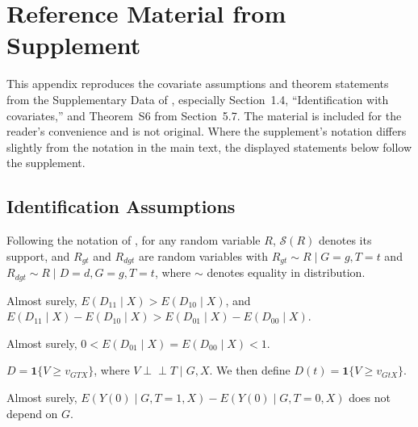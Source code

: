 \section{Reference Material from \citet{fuzzy2018} Supplement}\label{sec:app_cdh_reference}

This appendix reproduces the covariate assumptions and theorem statements from the Supplementary Data of \citet{fuzzy2018}, especially Section~1.4, ``Identification with covariates,'' and Theorem~S6 from Section~5.7. The material is included for the reader's convenience and is not original. Where the supplement's notation differs slightly from the notation in the main text, the displayed statements below follow the supplement.

\subsection{Identification Assumptions}\label{sec:app_setup}

Following the notation of \citet{fuzzy2018}, for any random variable $R$, $\mathcal{S}(R)$ denotes its support, and $R_{gt}$ and $R_{dgt}$ are random variables with $R_{gt} \sim R \mid G=g, T=t$ and $R_{dgt} \sim R \mid D=d, G=g, T=t$, where $\sim$ denotes equality in distribution.

\renewcommand{\theassumption}{\arabic{assumption}X}
\setcounter{assumption}{0}

\begin{assumption}\label{ass:1}
Almost surely, $E(D_{11}\mid X) > E(D_{10}\mid X)$, and $E(D_{11}\mid X)-E(D_{10}\mid X) > E(D_{01}\mid X)-E(D_{00}\mid X)$.
\end{assumption}

\begin{assumption}\label{ass:2}
Almost surely, $0 < E(D_{01}\mid X) = E(D_{00}\mid X) < 1$.
\end{assumption}

\begin{assumption}\label{ass:3}
$D = \mathbf{1}\{V \ge v_{GTX}\}$, where $V \perp\!\!\!\perp T \mid G,X$. We then define $D(t) = \mathbf{1}\{V \ge v_{GtX}\}$.
\end{assumption}

\begin{assumption}\label{ass:4}
Almost surely, $E(Y(0)\mid G, T = 1, X) - E(Y(0)\mid G, T = 0, X)$ does not depend on $G$.
\end{assumption}

